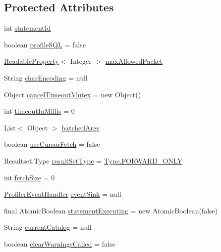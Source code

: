 \subsection*{Protected Attributes}
\begin{DoxyCompactItemize}
\item 
int \mbox{\hyperlink{classcom_1_1mysql_1_1cj_1_1_abstract_query_a1a1a548cf42ced27b8acbba291cb6824}{statement\+Id}}
\item 
boolean \mbox{\hyperlink{classcom_1_1mysql_1_1cj_1_1_abstract_query_a424a97f20af494a51e131f6512d24c05}{profile\+S\+QL}} = false
\item 
\mbox{\hyperlink{interfacecom_1_1mysql_1_1cj_1_1conf_1_1_readable_property}{Readable\+Property}}$<$ Integer $>$ \mbox{\hyperlink{classcom_1_1mysql_1_1cj_1_1_abstract_query_ae00214b2edf31e71902312a9b670fb8c}{max\+Allowed\+Packet}}
\item 
String \mbox{\hyperlink{classcom_1_1mysql_1_1cj_1_1_abstract_query_a8e5db804cd1879f5250c1ee854d819c8}{char\+Encoding}} = null
\item 
Object \mbox{\hyperlink{classcom_1_1mysql_1_1cj_1_1_abstract_query_a8d79e7b4fdf7ff40755b88ccfc4b9cbd}{cancel\+Timeout\+Mutex}} = new Object()
\item 
int \mbox{\hyperlink{classcom_1_1mysql_1_1cj_1_1_abstract_query_ad17e5fb0c9a8a7c413116831638c8651}{timeout\+In\+Millis}} = 0
\item 
List$<$ Object $>$ \mbox{\hyperlink{classcom_1_1mysql_1_1cj_1_1_abstract_query_afe296cec9d344624f3880e21cf450cc0}{batched\+Args}}
\item 
boolean \mbox{\hyperlink{classcom_1_1mysql_1_1cj_1_1_abstract_query_a0e9d56291ce3045b9ab52eef735f13cf}{use\+Cursor\+Fetch}} = false
\item 
Resultset.\+Type \mbox{\hyperlink{classcom_1_1mysql_1_1cj_1_1_abstract_query_a221d45e7acb58be1e2ec467a90df6a20}{result\+Set\+Type}} = \mbox{\hyperlink{enumcom_1_1mysql_1_1cj_1_1protocol_1_1_resultset_1_1_type_ad7cddf3eb759b3961780262b09b0217b}{Type.\+F\+O\+R\+W\+A\+R\+D\+\_\+\+O\+N\+LY}}
\item 
int \mbox{\hyperlink{classcom_1_1mysql_1_1cj_1_1_abstract_query_ab5542f44a4ae49ed220f44aa4baae03f}{fetch\+Size}} = 0
\item 
\mbox{\hyperlink{interfacecom_1_1mysql_1_1cj_1_1log_1_1_profiler_event_handler}{Profiler\+Event\+Handler}} \mbox{\hyperlink{classcom_1_1mysql_1_1cj_1_1_abstract_query_ab150ac7bec3ab4662187594132c91fc0}{event\+Sink}} = null
\item 
final Atomic\+Boolean \mbox{\hyperlink{classcom_1_1mysql_1_1cj_1_1_abstract_query_a7bc25dcd0d74d8489a3e689fc2277379}{statement\+Executing}} = new Atomic\+Boolean(false)
\item 
String \mbox{\hyperlink{classcom_1_1mysql_1_1cj_1_1_abstract_query_a1b25ce6bc0b1b35dca039d246b51da60}{current\+Catalog}} = null
\item 
boolean \mbox{\hyperlink{classcom_1_1mysql_1_1cj_1_1_abstract_query_ad74a8ec76b857307a4271c7078454b8c}{clear\+Warnings\+Called}} = false
\end{DoxyCompactItemize}


